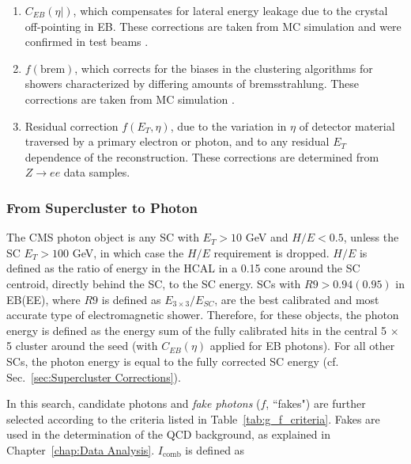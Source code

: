 \documentclass[dissertation.tex]{subfiles}
\begin{document}
\begin{enumerate}
  \item $C_{EB}(\eta|)$, which compensates for lateral energy leakage due to the crystal off-pointing in EB.  These corrections are taken from MC simulation \cite{ECAL_SC_note} and were confirmed in test beams \cite{EB_startup_intercalibration}.
  \item $f(\mbox{brem})$, which corrects for the biases in the clustering algorithms for showers characterized by differing amounts of bremsstrahlung.  These corrections are taken from MC simulation \cite{ECAL_SC_note}.
  \item Residual correction $f(E_{T}, \eta)$, due to the variation in $\eta$ of detector material traversed by a primary electron or photon, and to any residual $E_{T}$ dependence of the reconstruction.  These corrections are determined from $Z\rightarrow ee$ data samples. %
\end{enumerate}


\subsubsection{From Supercluster to Photon}
\label{sec:From Supercluster to Photon}

The CMS photon object is any SC with $E_{T} > 10$ GeV and $H/E < 0.5$, unless the SC $E_{T} > 100$ GeV, in which case the $H/E$ requirement is dropped.  $H/E$ is defined as the ratio of energy in the HCAL in a 0.15 cone around the SC centroid, directly behind the SC, to the SC energy.  SCs with $R9 > 0.94(0.95)$ in EB(EE), where $R9$ is defined as $E_{3\times 3}/E_{SC}$,  are the best calibrated and most accurate type of electromagnetic shower.  Therefore, for these objects, the photon energy is defined as the energy sum of the fully calibrated hits in the central 5 $\times$ 5 cluster around the seed (with $C_{EB}(\eta)$ applied for EB photons).  For all other SCs, the photon energy is equal to the fully corrected SC energy (cf. Sec.~\ref{sec:Supercluster Corrections}).

In this search, candidate photons and \textit{fake photons} ($\mathit{f}$, ``fakes") are further selected according to the criteria listed in Table~\ref{tab:g_f_criteria}.  Fakes are used in the determination of the QCD background, as explained in Chapter~\ref{chap:Data Analysis}.  $I_{\mathrm{comb}}$ is defined as
\end{document}
